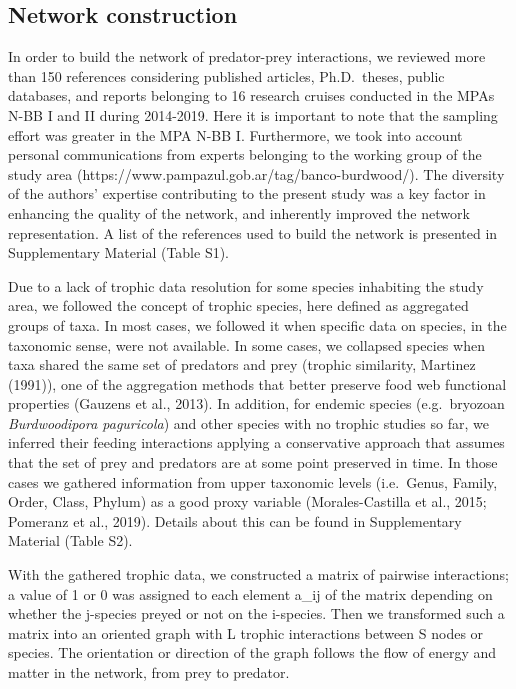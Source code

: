 \documentclass[preprint, 3p,
authoryear]{elsarticle} %
\begin{document}
\hypertarget{network-construction}{%
\subsection{Network construction}\label{network-construction}}

In order to build the network of predator-prey interactions, we reviewed
more than 150 references considering published articles, Ph.D.~theses,
public databases, and reports belonging to 16 research cruises conducted
in the MPAs N-BB I and II during 2014-2019. Here it is important to note
that the sampling effort was greater in the MPA N-BB I. Furthermore, we
took into account personal communications from experts belonging to the
working group of the study area
(https://www.pampazul.gob.ar/tag/banco-burdwood/). The diversity of the
authors' expertise contributing to the present study was a key factor in
enhancing the quality of the network, and inherently improved the
network representation. A list of the references used to build the
network is presented in Supplementary Material (Table S1).

Due to a lack of trophic data resolution for some species inhabiting the
study area, we followed the concept of trophic species, here defined as
aggregated groups of taxa. In most cases, we followed it when specific
data on species, in the taxonomic sense, were not available. In some
cases, we collapsed species when taxa shared the same set of predators
and prey (trophic similarity, Martinez (1991)), one of the aggregation
methods that better preserve food web functional properties (Gauzens et
al., 2013). In addition, for endemic species (e.g.~bryozoan
\emph{Burdwoodipora paguricola}) and other species with no trophic
studies so far, we inferred their feeding interactions applying a
conservative approach that assumes that the set of prey and predators
are at some point preserved in time. In those cases we gathered
information from upper taxonomic levels (i.e.~Genus, Family, Order,
Class, Phylum) as a good proxy variable (Morales-Castilla et al., 2015;
Pomeranz et al., 2019). Details about this can be found in Supplementary
Material (Table S2).

With the gathered trophic data, we constructed a matrix of pairwise
interactions; a value of 1 or 0 was assigned to each element a\_ij of
the matrix depending on whether the j-species preyed or not on the
i-species. Then we transformed such a matrix into an oriented graph with
L trophic interactions between S nodes or species. The orientation or
direction of the graph follows the flow of energy and matter in the
network, from prey to predator.
\end{document}
